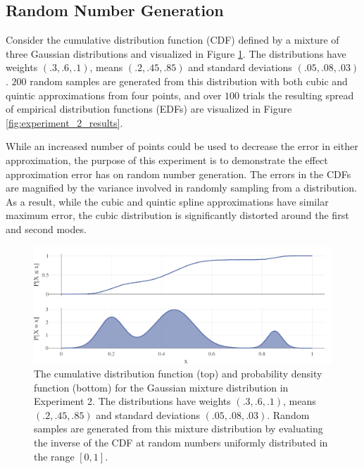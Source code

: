 \documentclass{scspaperproc}
\theoremstyle{scsthe}
\begin{document}
\subsection{Random Number Generation}

Consider the cumulative distribution function (CDF) defined by a mixture of three Gaussian distributions and visualized in Figure \ref{fig:experiment_2_distribution}. The distributions have weights $(.3, .6, .1)$, means $(.2, .45, .85)$ and standard deviations $(.05, .08, .03)$. $200$ random samples are generated from this distribution with both cubic and quintic approximations from four points, and over $100$ trials the resulting spread of empirical distribution functions (EDFs) are visualized in Figure \ref{fig:experiment_2_results}.

While an increased number of points could be used to decrease the error in either approximation, the purpose of this experiment is to demonstrate the effect approximation error has on random number generation. The errors in the CDFs are magnified by the variance involved in randomly sampling from a distribution. As a result, while the cubic and quintic spline approximations have similar maximum error, the cubic distribution is significantly distorted around the first and second modes.

\begin{figure}
  \centering
  \includegraphics[width=.8\textwidth]{experiment_2_distribution}
  \caption{The cumulative distribution function (top) and probability density function (bottom) for the Gaussian mixture distribution in Experiment 2. The distributions have weights $(.3, .6, .1)$, means $(.2, .45, .85)$ and standard deviations $(.05, .08, .03)$. Random samples are generated from this mixture distribution by evaluating the inverse of the CDF at random numbers uniformly distributed in the range $[0,1]$.}
  \label{fig:experiment_2_distribution}
\end{figure}
\end{document}
